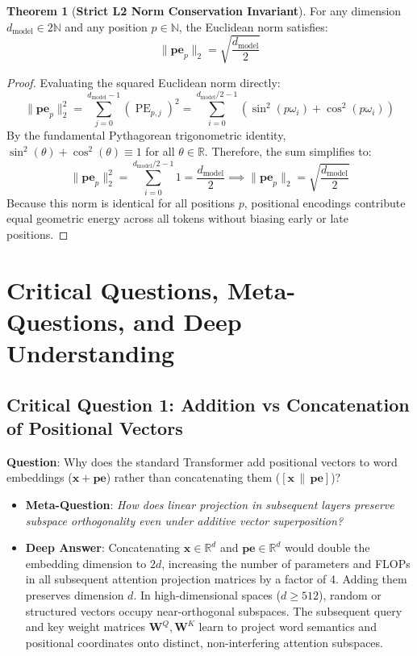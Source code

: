\documentclass[11pt,a4paper]{article}
\theoremstyle{definition}
\newtheorem{theorem}{\textbf{Theorem}}[section]
\begin{document}
\begin{theorem}[\textbf{Strict L2 Norm Conservation Invariant}]
For any dimension $d_{\text{model}} \in 2\mathbb{N}$ and any position $p \in \mathbb{N}$, the Euclidean norm satisfies:
{\boldmath
\begin{equation}
\|\mathbf{pe}_p\|_2 = \sqrt{\frac{d_{\text{model}}}{2}}
\end{equation}
}
\end{theorem}

\begin{proof}
Evaluating the squared Euclidean norm directly:
{\boldmath
\begin{equation}
\|\mathbf{pe}_p\|_2^2 = \sum_{j=0}^{d_{\text{model}}-1} (\operatorname{PE}_{p, j})^2 = \sum_{i=0}^{d_{\text{model}}/2 - 1} \left( \sin^2(p\omega_i) + \cos^2(p\omega_i) \right)
\end{equation}
}
By the fundamental Pythagorean trigonometric identity, $\sin^2(\theta) + \cos^2(\theta) \equiv 1$ for all $\theta \in \mathbb{R}$.
Therefore, the sum simplifies to:
{\boldmath
\begin{equation}
\|\mathbf{pe}_p\|_2^2 = \sum_{i=0}^{d_{\text{model}}/2 - 1} 1 = \frac{d_{\text{model}}}{2} \implies \|\mathbf{pe}_p\|_2 = \sqrt{\frac{d_{\text{model}}}{2}}
\end{equation}
}
Because this norm is identical for all positions $p$, positional encodings contribute equal geometric energy across all tokens without biasing early or late positions.
\end{proof}

\section{Critical Questions, Meta-Questions, and Deep Understanding}

\subsection{\textbf{Critical Question 1: Addition vs Concatenation of Positional Vectors}}
\textbf{Question}: Why does the standard Transformer add positional vectors to word embeddings ($\mathbf{x} + \mathbf{pe}$) rather than concatenating them ($[\mathbf{x} \,\|\, \mathbf{pe}]$)?
\begin{itemize}
    \item \textbf{Meta-Question}: \emph{How does linear projection in subsequent layers preserve subspace orthogonality even under additive vector superposition?}
    \item \textbf{Deep Answer}: Concatenating $\mathbf{x} \in \mathbb{R}^d$ and $\mathbf{pe} \in \mathbb{R}^d$ would double the embedding dimension to $2d$, increasing the number of parameters and FLOPs in all subsequent attention projection matrices by a factor of 4. Adding them preserves dimension $d$. In high-dimensional spaces ($d \ge 512$), random or structured vectors occupy near-orthogonal subspaces. The subsequent query and key weight matrices $\mathbf{W}^Q, \mathbf{W}^K$ learn to project word semantics and positional coordinates onto distinct, non-interfering attention subspaces.
\end{itemize}
\end{document}
